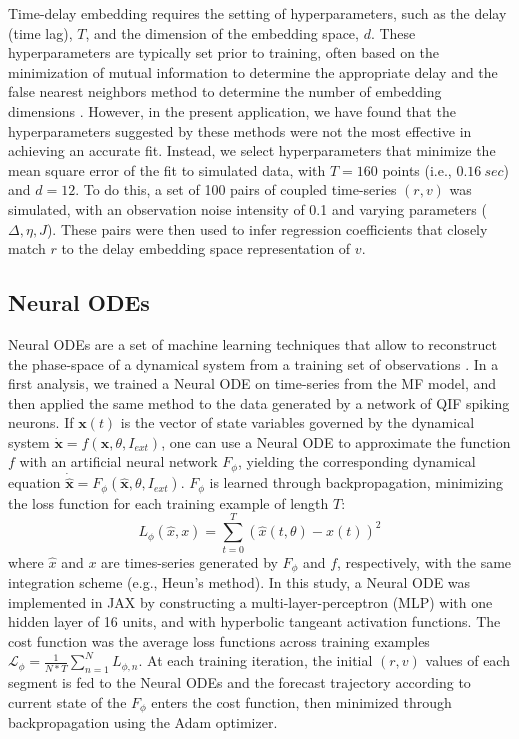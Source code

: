 \documentclass[preprint,11pt,authoryear]{elsarticle}
\begin{document}
Time-delay embedding requires the setting of hyperparameters, such as the delay (time lag), $T$, and  the dimension of the embedding space, $d$. These hyperparameters are typically set prior to training, often based on the minimization of mutual information to determine the appropriate delay and the false nearest neighbors method to determine the number of embedding dimensions \citep{Kennel1992, Tan2023}. However, in the present application, we have found that the hyperparameters suggested by these methods were not the most effective in achieving an accurate fit. Instead, we select hyperparameters that minimize the mean square error of the fit to simulated data, with $T=160$ points (i.e., $0.16~sec$) and $d=12$. To do this, a set of 100 pairs of coupled time-series $(r, v)$ was simulated, with an observation noise intensity of 0.1 and varying parameters ($\Delta, \eta, J$). These pairs were then used to infer regression coefficients that closely match $r$ to the delay embedding space representation of $v$.




\subsection{Neural ODEs}

Neural ODEs are a set of machine learning techniques that allow to reconstruct the phase-space of a dynamical system from a training set of observations \citep{Chen2018}. In a first analysis, we trained a Neural ODE on time-series from the MF model, and then applied the same method to the data generated by a network of QIF spiking neurons. If $\textbf{x}(t)$ is the vector of state variables governed by the dynamical system $\dot{\textbf{x}} = f(\textbf{x}, \theta,I_{ext})$, one can use a Neural ODE to approximate the function $f$ with an artificial neural network $F_{\phi}$, yielding the corresponding dynamical equation $\dot{\hat{\textbf{x}}} = F_{\phi}(\hat{\textbf{x}},\theta,I_{ext})$. $F_{\phi}$ is learned through backpropagation, minimizing the loss function for each training example of length $T$: 
\[L_{\phi}(\hat{x},x)={\sum_{t=0}^{T}(\hat{x}(t, \theta)-x(t))^2}\]
where $\hat{x}$ and $x$ are times-series generated by $F_{\phi}$ and $f$,  respectively, with the same integration scheme (e.g., Heun's method). In this study, a Neural ODE was implemented in JAX \citep{jax2018github} by constructing a multi-layer-perceptron (MLP) with one hidden layer of 16 units, and with hyperbolic tangeant activation functions. The cost function was the average loss functions across training examples $\mathcal{L_{\phi}}=\frac{1}{N*T}\sum_{n=1}^{N}L_{\phi,n}$. 
At each training iteration, the initial $(r, v)$ values of each segment is fed to the Neural ODEs and the forecast trajectory according to current state of the $F_{\phi}$ enters the cost function, then minimized through backpropagation using the Adam optimizer. 
\end{document}
